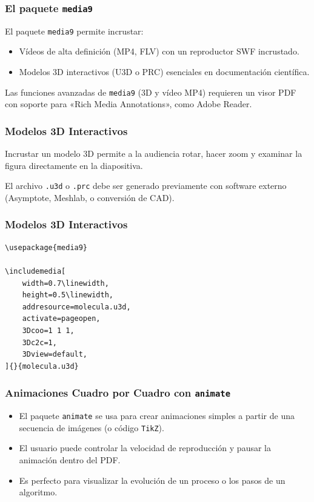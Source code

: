 \documentclass[12pt,aspectratio=169,ignorenonframetext]{ltxbeamer}
\begin{document}
\begin{frame}
\frametitle{El paquete \texttt{media9}}
El paquete \texttt{media9} permite incrustar:

\begin{itemize}
    \item Vídeos de alta definición (MP4, FLV) con un reproductor SWF incrustado.
    \item Modelos 3D interactivos (U3D o PRC) esenciales en documentación científica.
\end{itemize}

Las funciones avanzadas de \texttt{media9} (3D y vídeo MP4) requieren un visor PDF con soporte para «Rich Media Annotations», como Adobe Reader.
\end{frame}





\begin{frame}[fragile]
\frametitle{Modelos 3D Interactivos}

Incrustar un modelo 3D permite a la audiencia rotar, hacer zoom y examinar la figura directamente en la diapositiva.

\pause

El archivo \texttt{.u3d} o \texttt{.prc} debe ser generado previamente con software externo (Asymptote, Meshlab, o conversión de CAD).
\end{frame}




\begin{frame}[fragile]
\frametitle{Modelos 3D Interactivos}

\begin{verbatim}
\usepackage{media9}

\includemedia[
    width=0.7\linewidth,
    height=0.5\linewidth,
    addresource=molecula.u3d,
    activate=pageopen,
    3Dcoo=1 1 1,
    3Dc2c=1,
    3Dview=default,
]{}{molecula.u3d}
\end{verbatim}
\end{frame}





\begin{frame}
\frametitle{Animaciones Cuadro por Cuadro con \texttt{animate}}

\pause

\begin{itemize}[<+->]
    \item El paquete \texttt{animate} se usa para crear animaciones simples a partir de una secuencia de imágenes (o código \texttt{TikZ}).
    \item El usuario puede controlar la velocidad de reproducción y pausar la animación dentro del PDF.
    \item Es perfecto para visualizar la evolución de un proceso o los pasos de un algoritmo.
\end{itemize}
\end{frame}
\end{document}
